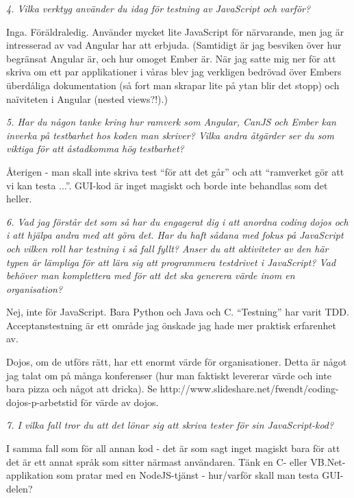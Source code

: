 \documentclass[11pt]{article}
\begin{document}
\emph{4. Vilka verktyg använder du idag för testning av JavaScript och varför?}

Inga. Föräldraledig. Använder mycket lite JavaScript för närvarande, men
jag är intresserad av vad Angular har att erbjuda. (Samtidigt är jag
besviken över hur begränsat Angular är, och hur omoget Ember är. När jag
satte mig ner för att skriva om ett par applikationer i våras blev jag
verkligen bedrövad över Embers überdåliga dokumentation (så fort man
skrapar lite på ytan blir det stopp) och naïviteten i Angular (nested
views?!).)

\emph{5. Har du någon tanke kring hur ramverk som Angular, CanJS och Ember kan
inverka på testbarhet hos koden man skriver? Vilka andra åtgärder ser
du som viktiga för att åstadkomma hög testbarhet?}

Återigen - man skall inte skriva test ``för att det går'' och att
``ramverket gör att vi kan testa ...''. GUI-kod är inget magiskt och borde
inte behandlas som det heller.

\emph{6. Vad jag förstår det som så har du engagerat dig i att anordna coding
dojos och i att hjälpa andra med att göra det. Har du haft sådana med
fokus på JavaScript och vilken roll har testning i så fall fyllt?
Anser du att aktiviteter av den här typen är lämpliga för att lära sig
att programmera testdrivet i JavaScript? Vad behöver man komplettera
med för att det ska generera värde inom en organisation?}

Nej, inte för JavaScript. Bara Python och Java och C\nolinebreak\hspace{-.05em}\raisebox{.3ex}{\scriptsize\bf \#}. ``Testning'' har varit TDD.
Acceptanstestning är ett område jag önskade jag hade mer praktisk
erfarenhet av.

Dojos, om de utförs rätt, har ett enormt värde för organisationer. Detta
är något jag talat om på många konferenser (hur man faktiskt levererar
värde och inte bara pizza och något att dricka).
Se http://www.slideshare.net/fwendt/coding-dojos-p-arbetstid för värde av
dojos.

\emph{7. I vilka fall tror du att det lönar sig att skriva tester för sin
JavaScript-kod?}

I samma fall som för all annan kod - det är som sagt inget magiskt bara
för att det är ett annat språk som sitter närmast användaren. Tänk en
C\nolinebreak\hspace{-.05em}\raisebox{.3ex}{\scriptsize\bf \#}- eller
VB.Net-applikation som pratar med en NodeJS-tjänst -
hur/varför skall man testa GUI-delen?
\end{document}
